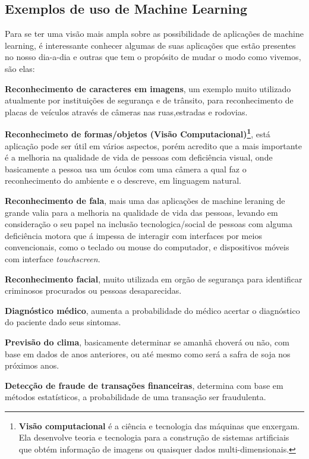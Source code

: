 \subsection{Exemplos de uso de Machine Learning}
\label{cap:exemplos-ml}

Para se ter uma visão mais ampla sobre as possibilidade de aplicações de machine learning,
 é interessante conhecer algumas de suas aplicações que estão presentes no nosso dia-a-dia e outras que tem o propósito de 
 mudar o modo como vivemos, são elas:

 \begin{alineas}
	\item \textbf{Reconhecimento de caracteres em imagens}, um exemplo muito utilizado atualmente por instituições de segurança e de trânsito, para 
	reconhecimento de placas de veículos através de câmeras nas ruas,estradas e rodovias.  
	\item \textbf{Reconhecimeto de formas/objetos (Visão Computacional)\footnote{\cite{vscomp}\textbf{Visão computacional} é a ciência e tecnologia das máquinas que enxergam. Ela desenvolve teoria e tecnologia para a construção de sistemas artificiais que obtém informação de imagens ou quaisquer dados multi-dimensionais.}}, está aplicação pode ser útil em vários aspectos, porém acredito que a mais importante 
	é a melhoria na qualidade de vida de pessoas com deficiência visual, onde basicamente a pessoa usa um óculos com uma câmera a qual faz o reconhecimento do ambiente
	e o descreve, em linguagem natural.  
	\item \textbf{Reconhecimento de fala}, mais uma das aplicações de machine leraning de grande valia para a melhoria na qualidade de vida das pessoas,
	levando em consideração o seu papel na inclusão tecnologica/social de pessoas com alguma deficiência motora que á impessa de interagir 
	com interfaces por meios convencionais, como o teclado ou  mouse do computador, e dispositivos móveis com interface \textit{touchscreen}.
	\item \textbf{Reconhecimento facial}, muito utilizada em orgão de segurança para identificar criminosos procurados ou pessoas desaparecidas.
	\item \textbf{Diagnóstico médico}, aumenta a probabilidade do médico acertar o diagnóstico do paciente dado seus sintomas.   
	\item \textbf{Previsão do clima}, basicamente determinar se amanhã choverá ou não, com base em dados de anos anteriores, ou até mesmo como será a 
	safra de soja nos próximos anos. 
	\item \textbf{Detecção de fraude de transações financeiras}, determina com base em métodos estatísticos, a probabilidade de uma transação ser fraudulenta.
 \end{alineas}

